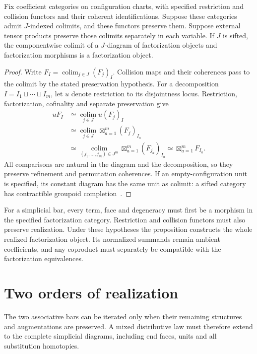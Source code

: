 \begin{proposition}
\label{cbc:bars:factorization-realization}
Fix coefficient categories on configuration charts, with specified restriction and collision functors and their coherent identifications. Suppose these categories admit $J$-indexed colimits, and these functors preserve them. Suppose external tensor products preserve those colimits separately in each variable. If $J$ is sifted, the componentwise colimit of a $J$-diagram of factorization objects and factorization morphisms is a factorization object.
\end{proposition}
\begin{proof}
Write $F_I=\operatorname*{colim}_{j\in J}(F_j)_I$. Collision maps and their coherences pass to the colimit by the stated preservation hypothesis. For a decomposition $I=I_1\sqcup\cdots\sqcup I_m$, let $u$ denote restriction to its disjointness locus. Restriction, factorization, cofinality and separate preservation give
\[
\begin{aligned}
 uF_I
 &\simeq\operatorname*{colim}_{j\in J}u(F_j)_I\\
 &\simeq\operatorname*{colim}_{j\in J}
        \mathop{\boxtimes}_{a=1}^m(F_j)_{I_a}\\
 &\simeq\operatorname*{colim}_{(j_1,\ldots,j_m)\in J^m}
        \mathop{\boxtimes}_{a=1}^m(F_{j_a})_{I_a}
 \simeq\mathop{\boxtimes}_{a=1}^m F_{I_a}.
\end{aligned}
\]
All comparisons are natural in the diagram and the decomposition, so they preserve refinement and permutation coherences. If an empty-configuration unit is specified, its constant diagram has the same unit as colimit: a sifted category has contractible groupoid completion~\cite[Proposition~5.5.8.7]{LurieHTT}.
\end{proof}

For a simplicial bar, every term, face and degeneracy must first be a morphism in the specified factorization category. Restriction and collision functors must also preserve realization. Under these hypotheses the proposition constructs the whole realized factorization object. Its normalized summands remain ambient coefficients, and any coproduct must separately be compatible with the factorization equivalences.

\section{Two orders of realization}
The two associative bars can be iterated only when their remaining structures and augmentations are preserved. A mixed distributive law must therefore extend to the complete simplicial diagrams, including end faces, units and all substitution homotopies.

